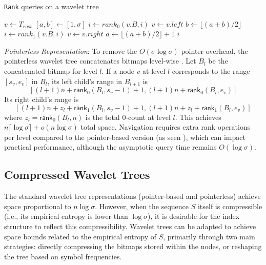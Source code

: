 \begin{algorithm}[h!]
    \caption{\texttt{Rank} queries on a wavelet tree}\label{alg:rank_wt}
    \begin{algorithmic}
        \State $v \gets T_{root}$ 
        \State $[a,b] \gets [1,\sigma]$
        \State $i \gets rank_0(v.B,i)$
        \State $v \gets v.left$ 
        \State $b \gets \lfloor (a+b)/2 \rfloor$
        \Else
        \State $i \gets rank_1(v.B,i)$
        \State $v \gets v.right$ 
        \State $a \gets \lfloor (a+b)/2 \rfloor +1$
        \EndIf
        \EndWhile
        \State \Return $i$
        \EndFunction
    \end{algorithmic}
\end{algorithm}

\emph{Pointerless Representation}: To remove the $O(\sigma \log \sigma)$ pointer overhead, the pointerless wavelet tree concatenates bitmaps level-wise \cite{MAKINEN2007332, MAKINEN2006703}. Let $B_l$ be the concatenated bitmap for level $l$. If a node $v$ at level $l$ corresponds to the range $[s_v, e_v]$ in $B_l$, its left child's range in $B_{l+1}$ is
\[
    [(l+1)n + \textsf{rank}_0(B_l, s_v-1) + 1, (l+1)n + \textsf{rank}_0(B_l, e_v)]
\]
Its right child's range is
\[
    [(l+1)n + z_l + \textsf{rank}_1(B_l, s_v-1) + 1, (l+1)n + z_l + \textsf{rank}_1(B_l, e_v)]
\]
where $z_l = \textsf{rank}_0(B_l, n)$ is the total $0$-count at level $l$. This achieves $n \lceil \log \sigma \rceil + o(n \log \sigma)$ total space. Navigation requires extra \textsf{rank} operations per level compared to the pointer-based version (as seen \cite{claude2015wavelet}), which can impact practical performance, although the asymptotic query time remains $O(\log \sigma)$.

\subsection{Compressed Wavelet Trees} \label{sec:compressed_WT}

The standard wavelet tree representations (pointer-based and pointerless) achieve space proportional to $n \log \sigma$. However, when the sequence $S$ itself is compressible (i.e., its empirical entropy is lower than $\log \sigma$), it is desirable for the index structure to reflect this compressibility. Wavelet trees can be adapted to achieve space bounds related to the empirical entropy of $S$, primarily through two main strategies: directly compressing the bitmaps stored within the nodes, or reshaping the tree based on symbol frequencies.

